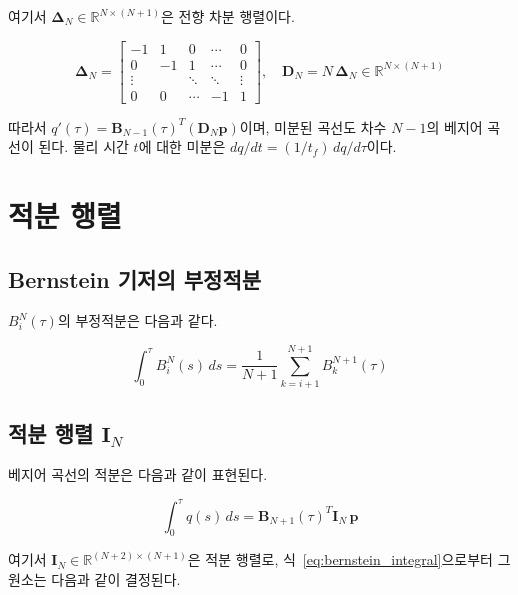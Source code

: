 \documentclass[11pt]{article}
\begin{document}
여기서 $\boldsymbol{\Delta}_N \in \mathbb{R}^{N \times (N+1)}$은 전향 차분 행렬이다.

\begin{equation}
  \boldsymbol{\Delta}_N =
  \begin{bmatrix}
    -1 &  1 &  0 & \cdots & 0 \\
     0 & -1 &  1 & \cdots & 0 \\
     \vdots & & \ddots & \ddots & \vdots \\
     0 & 0 & \cdots & -1 & 1
  \end{bmatrix}, \quad
  \mathbf{D}_N = N\,\boldsymbol{\Delta}_N \in \mathbb{R}^{N \times (N+1)}
  \label{eq:diff_matrix}
\end{equation}

따라서 $q'(\tau) = \mathbf{B}_{N-1}(\tau)^T (\mathbf{D}_N \mathbf{p})$이며,
미분된 곡선도 차수 $N-1$의 베지어 곡선이 된다.
물리 시간 $t$에 대한 미분은 $dq/dt = (1/t_f)\, dq/d\tau$이다.

\section{적분 행렬}

\subsection{Bernstein 기저의 부정적분}

$B_i^N(\tau)$의 부정적분은 다음과 같다.

\begin{equation}
  \int_0^\tau B_i^N(s)\,ds = \frac{1}{N+1}\sum_{k=i+1}^{N+1} B_k^{N+1}(\tau)
  \label{eq:bernstein_integral}
\end{equation}

\subsection{적분 행렬 $\mathbf{I}_N$}

베지어 곡선의 적분은 다음과 같이 표현된다.

\begin{equation}
  \int_0^\tau q(s)\,ds = \mathbf{B}_{N+1}(\tau)^T \mathbf{I}_N\, \mathbf{p}
  \label{eq:bezier_integral}
\end{equation}

여기서 $\mathbf{I}_N \in \mathbb{R}^{(N+2)\times(N+1)}$은 적분 행렬로,
식~\eqref{eq:bernstein_integral}으로부터 그 원소는 다음과 같이 결정된다.
\end{document}
